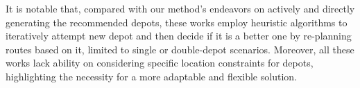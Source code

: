 It is notable that, compared with our method's endeavors on actively and directly generating the recommended depots, 
these works employ heuristic algorithms to iteratively attempt new depot and then decide if it is a better one by re-planning routes based on it, 
limited to single or double-depot scenarios.
Moreover, all these works lack ability on considering specific location constraints for depots, 
highlighting the necessity for a more adaptable and flexible solution.


